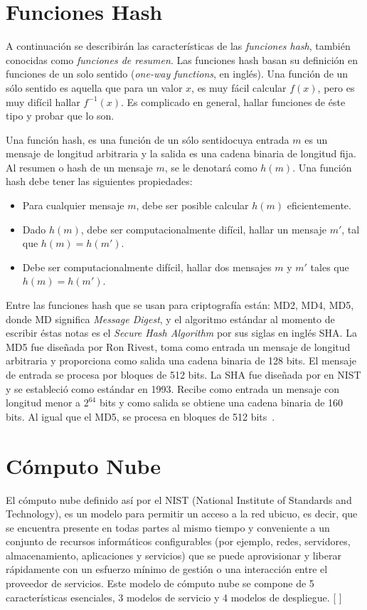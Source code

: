 \pagebreak
\section{Funciones Hash}
A continuaci\'on se describir\'an las caracter\'isticas de las {\it funciones
hash}, tambi\'en conocidas como {\it funciones de resumen}. Las funciones hash basan
su definici\'on en funciones de un solo sentido  ({\it one-way functions}, en ingl\'es).
Una funci\'on de un s\'olo sentido es aquella que para un valor $x$, es 
muy f\'acil calcular $f(x)$, pero es muy dif\'icil hallar $f^{-1}(x)$. Es 
complicado en general, hallar funciones de \'este tipo y probar que lo 
son.
\begin{definition}
Una funci\'on hash, es una funci\'on de un s\'olo sentidocuya entrada $m$
 es un mensaje de longitud arbitraria
y la salida es una cadena binaria de longitud fija. Al resumen o hash de 
un mensaje $m$, se le denotar\'a como $h(m)$. Una funci\'on hash debe
tener las siguientes propiedades:
\begin{itemize}
\item Para cualquier mensaje $m$, debe ser posible calcular $h(m)$ 
eficientemente. 
\item Dado $h(m)$, debe ser computacionalmente dif\'icil, hallar un mensaje
$m'$, tal que $h(m)=h(m')$.
\item Debe ser computacionalmente dif\'icil, hallar dos mensajes $m$ y $m'$ 
tales que $h(m)=h(m')$.
\end{itemize}
\end{definition}
 
Entre las funciones hash que se usan para criptograf\'ia est\'an: MD2, MD4,
MD5, donde MD significa {\it Message Digest}, y el algoritmo est\'andar al momento de escribir \'estas notas es el {\it Secure Hash Algorithm} por sus siglas
en ingl\'es SHA.
  La MD5 fue dise\~nada por Ron Rivest, toma como entrada un mensaje de 
longitud arbitraria y proporciona como salida una cadena binaria de 128 bits.
El mensaje de entrada se procesa por bloques de 512 bits. 
  La SHA fue dise\~nada por en NIST y se estableci\'o como est\'andar
en 1993. Recibe como entrada un mensaje con longitud menor a $2^{64}$ bits y
como salida se obtiene una cadena binaria de 160 bits. Al igual que el
MD5, se procesa en bloques de 512 bits~\cite{modes}.
\pagebreak

\section{Cómputo Nube}
El cómputo nube definido así por el NIST (National Institute of Standards and Technology), es un modelo para permitir un acceso a la red ubicuo, es decir, que se encuentra presente en todas partes al mismo tiempo y conveniente a un conjunto de recursos informáticos configurables (por ejemplo, redes, servidores, almacenamiento, aplicaciones y servicios) que se puede aprovisionar y liberar rápidamente con un esfuerzo mínimo de gestión o una interacción entre el proveedor de servicios.
Este modelo de cómputo nube se compone de 5 características esenciales, 3 modelos de servicio y 4  modelos de despliegue. [  ] \\ \\  

